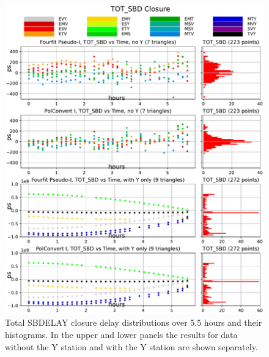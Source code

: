 \documentclass[letterpaper,twoside,12pt]{article}
\begin{document}
\begin{figure}[ht!]
  \begin{center}
  \includegraphics[width=40pc]{TOT_SBD_Closure_Delay_Y_no_Y.pdf}
  \caption{\small Total SBDELAY closure delay distributions over 5.5 hours and their histograms. In the upper and lower panels the results for data without the Y station and with the Y station are shown separately.}
  \label{tot_sbd}
  \end{center}
\end{figure}
\end{document}
